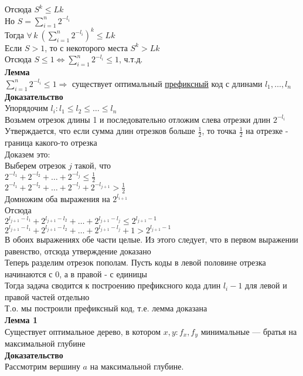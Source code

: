 \documentclass[12pt]{article}
\begin{document}
Отсюда $S^k \leq Lk$\\
Но $S = \sum_{i=1}^n 2^{-l_i}$\\
Тогда $\forall\,k\ (\sum_{i=1}^n 2^{-l_i})^k \leq Lk$\\
Если $S > 1$, то с некоторого места $S^k > Lk$\\
Отсюда $S \leq 1 \Leftrightarrow \sum_{i=1}^n 2^{-l_i} \leq 1$, ч.т.д.\\
\textbf{Лемма}\\
$\sum_{i=1}^n 2^{-l_i} \leq 1\Rightarrow$ существует оптимальный \underline{префиксный} код с длинами $l_1,\ldots,l_n$\\
\textbf{Доказательство}\\
Упорядочим $l_i: l_1 \leq l_2 \leq \ldots \leq l_n$\\
Возьмем отрезок длины 1 и последовательно отложим слева отрезки длин $2^{-l_i}$\\
Утверждается, что если сумма длин отрезков больше $\frac12$, то точка $\frac12$ на отрезке - граница какого-то отрезка\\
Доказем это:\\
Выберем отрезок $j$ такой, что\\
$2^{-l_1}+2^{-l_2}+\ldots+2^{-l_j} \leq \frac12$\\
$2^{-l_1}+2^{-l_2}+\ldots+2^{-l_j}+2^{-l_{j+1}} > \frac12$\\
Домножим оба выражения на $2^{l_{i+1}}$\\
Отсюда\\
$2^{l_{j+1}-l_1}+2^{l_{j+1}-l_2}+\ldots+2^{l_{j+1}-l_j} \leq 2^{l_{j+1}-1}$\\
$2^{l_{j+1}-l_1}+2^{l_{j+1}-l_2}+\ldots+2^{l_{j+1}-l_j}+1>2^{l_{j+1}-1}$\\
В обоих выражениях обе части целые. Из этого следует, что в первом выражении равенство, отсюда утверждение доказано\\
Теперь разделим отрезок пополам. Пусть коды в левой половине отрезка начинаются с 0, а в правой - с единицы\\
Тогда задача сводится к построению префиксного кода длин $l_i-1$ для левой и правой частей отдельно\\
Т.о. мы построили префиксный код, т.е. лемма доказана\\
\textbf{Лемма 1}\\
Существует оптимальное дерево, в котором $x,y: f_x,f_y$ минимальные --- братья на максимальной глубине\\
\textbf{Доказательство}\\
Рассмотрим вершину $a$ на максимальной глубине. 
\end{document}
